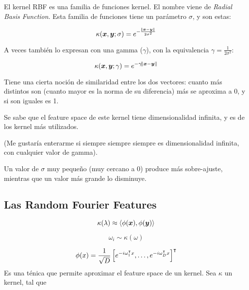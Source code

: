 El kernel RBF es una familia de funciones kernel. El nombre viene de
\textit{Radial Basis Function}. Esta familia de funciones tiene un parámetro
$\sigma$, y son estas:

\begin{equation}
 \kappa({\bm{x}, \bm{y}}; \sigma) = e^{-\frac{\norm{\bm{x} - \bm{y}}}{2\sigma^2}}
\end{equation}

A veces también lo expresan con una gamma ($\gamma$), con la equivalencia
$\gamma = \frac{1}{2\sigma^2}$:

\begin{equation}
 \kappa({\bm{x}, \bm{y}}; \gamma) = e^{-\gamma\norm{\bm{x} - \bm{y}}}
\end{equation}

Tiene una cierta noción de similaridad entre los dos vectores: cuanto más
distintos son (cuanto mayor es la norma de su diferencia) más se aproxima a 0,
y si son iguales es 1.


Se sabe que el feature space de este kernel tiene dimensionalidad infinita, y
es de los kernel más utilizados.

(Me gustaría enterarme si siempre siempre siempre es dimensionalidad infinita,
con cualquier valor de gamma).

Un valor de $\sigma$ muy pequeño (muy cercano a 0) produce más sobre-ajuste,
mientras que un valor más grande lo disminuye.


\subsection{Las Random Fourier Features}

\begin{equation}
  \kappa(\lambda) \approx \langle\phi(\bm{x}), \phi(\bm{y})\rangle
\end{equation}

\begin{equation}
  \omega_i \sim \kappa(\omega)
\end{equation}

\begin{equation}
  \phi(x) = \frac{1}{\sqrt{D}}\left[ e^{-i\omega^\intercal_1x}, \ldots, e^{-i\omega^\intercal_Dx} \right]^\intercal
\end{equation}
Es una ténica que permite aproximar el feature space de un kernel. Sea $\kappa$
un kernel, tal que

